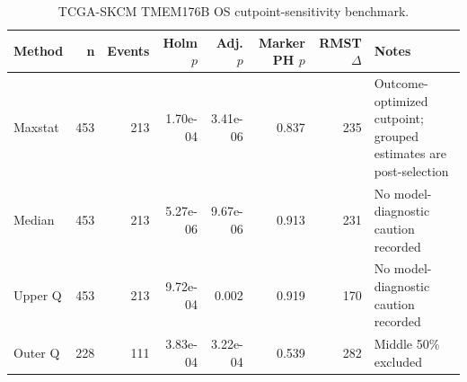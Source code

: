 \begin{table}[t]
\centering
\caption{TCGA-SKCM TMEM176B OS cutpoint-sensitivity benchmark.}
\label{tab:skcm-tmem176b-os-cutpoints}
\begin{tabular}{lrrrrrrl}
\toprule
Method & n & Events & Holm $p$ & Adj. $p$ & Marker PH $p$ & RMST $\Delta$ & Notes \\
\midrule
Maxstat & 453 & 213 & 1.70e-04 & 3.41e-06 & 0.837 & 235 & Outcome-optimized cutpoint; grouped estimates are post-selection \\
Median & 453 & 213 & 5.27e-06 & 9.67e-06 & 0.913 & 231 & No model-diagnostic caution recorded \\
Upper Q & 453 & 213 & 9.72e-04 & 0.002 & 0.919 & 170 & No model-diagnostic caution recorded \\
Outer Q & 228 & 111 & 3.83e-04 & 3.22e-04 & 0.539 & 282 & Middle 50\% excluded \\
\bottomrule
\end{tabular}
\end{table}
